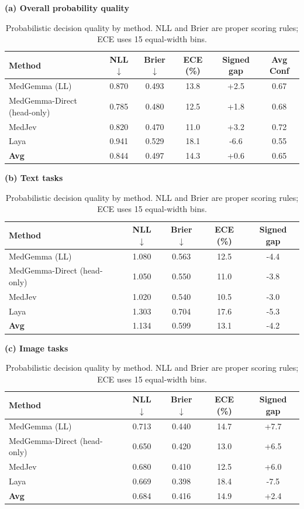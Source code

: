 \begin{table}[t]
\centering
\small
\setlength{\tabcolsep}{3pt}
\renewcommand{\arraystretch}{1.13}
\caption{Probabilistic decision quality by method. NLL and Brier are proper scoring rules; ECE uses 15 equal-width bins.}
\label{tab:probability}
\textbf{(a) Overall probability quality}\par\smallskip
\begin{tabular*}{\textwidth}{@{\extracolsep{\fill}}lccccc@{}}
\toprule
\textbf{Method} & \textbf{NLL $\downarrow$} & \textbf{Brier $\downarrow$} & \textbf{ECE (\%)} & \textbf{Signed gap} & \textbf{Avg Conf} \\
\midrule
MedGemma (LL) & 0.870 & 0.493 & 13.8 & +2.5 & 0.67 \\
MedGemma-Direct (head-only) & 0.785 & 0.480 & 12.5 & +1.8 & 0.68 \\
MedJev & 0.820 & 0.470 & 11.0 & +3.2 & 0.72 \\
Laya & 0.941 & 0.529 & 18.1 & -6.6 & 0.55 \\
\midrule
\textbf{Avg} & 0.844 & 0.497 & 14.3 & +0.6 & 0.65 \\
\bottomrule
\end{tabular*}
\par\medskip\textbf{(b) Text tasks}\par\smallskip
\begin{tabular*}{\textwidth}{@{\extracolsep{\fill}}lcccc@{}}
\toprule
\textbf{Method} & \textbf{NLL $\downarrow$} & \textbf{Brier $\downarrow$} & \textbf{ECE (\%)} & \textbf{Signed gap} \\
\midrule
MedGemma (LL) & 1.080 & 0.563 & 12.5 & -4.4 \\
MedGemma-Direct (head-only) & 1.050 & 0.550 & 11.0 & -3.8 \\
MedJev & 1.020 & 0.540 & 10.5 & -3.0 \\
Laya & 1.303 & 0.704 & 17.6 & -5.3 \\
\midrule
\textbf{Avg} & 1.134 & 0.599 & 13.1 & -4.2 \\
\bottomrule
\end{tabular*}
\par\medskip\textbf{(c) Image tasks}\par\smallskip
\begin{tabular*}{\textwidth}{@{\extracolsep{\fill}}lcccc@{}}
\toprule
\textbf{Method} & \textbf{NLL $\downarrow$} & \textbf{Brier $\downarrow$} & \textbf{ECE (\%)} & \textbf{Signed gap} \\
\midrule
MedGemma (LL) & 0.713 & 0.440 & 14.7 & +7.7 \\
MedGemma-Direct (head-only) & 0.650 & 0.420 & 13.0 & +6.5 \\
MedJev & 0.680 & 0.410 & 12.5 & +6.0 \\
Laya & 0.669 & 0.398 & 18.4 & -7.5 \\
\midrule
\textbf{Avg} & 0.684 & 0.416 & 14.9 & +2.4 \\
\bottomrule
\end{tabular*}
\end{table}
